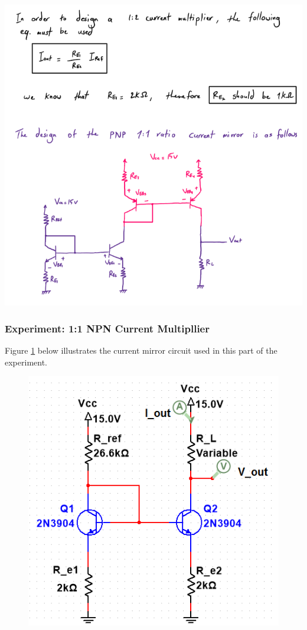 \documentclass{article}
\begin{document}
	\includegraphics[width=\linewidth]{prelab12.png}
	
	\pagebreak
	
	\subsubsection{Experiment: 1:1 NPN Current Multipllier}
	Figure \ref{f10} below illustrates the current mirror circuit used in this part of the experiment.
	\begin{figure}[!ht]
		\centering
		\includegraphics[width=0.57\linewidth]{d1-part3-circuit-npn-1_1.png}
		\label{f10}
	\end{figure}
	
\end{document}

